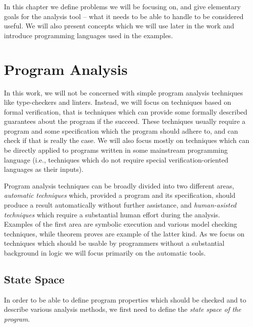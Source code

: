 In this chapter we define problems we will be focusing on, and give elementary goals for the analysis tool -- what it needs to be able to handle to be considered useful.
We will also present concepts which we will use later in the work and introduce programming languages used in the examples.

\section{Program Analysis} %

In this work, we will not be concerned with simple program analysis techniques like type-checkers and linters.
Instead, we will focus on techniques based on formal verification, that is techniques which can provide some formally described guarantees about the program if the succeed.
These techniques usually require a program and some specification which the program should adhere to, and can check if that is really the case.
We will also focus mostly on techniques which can be directly applied to programs written in some mainstream programming language (i.e., techniques which do not require special verification-oriented languages as their inputs).

Program analysis techniques can be broadly divided into two different areas, \emph{automatic techniques} which, provided a program and its specification, should produce a result automatically without further assistance, and \emph{human-asisted techniques} which require a substantial human effort during the analysis.
Examples of the first area are symbolic execution and various model checking techniques, while theorem proves are example of the latter kind.
As we focus on techniques which should be usable by programmers without a substantial background in logic we will focus primarily on the automatic tools.


\subsection{State Space}

In order to be able to define program properties which should be checked and to describe various analysis methods, we first need to define the \emph{state space of the program}.


